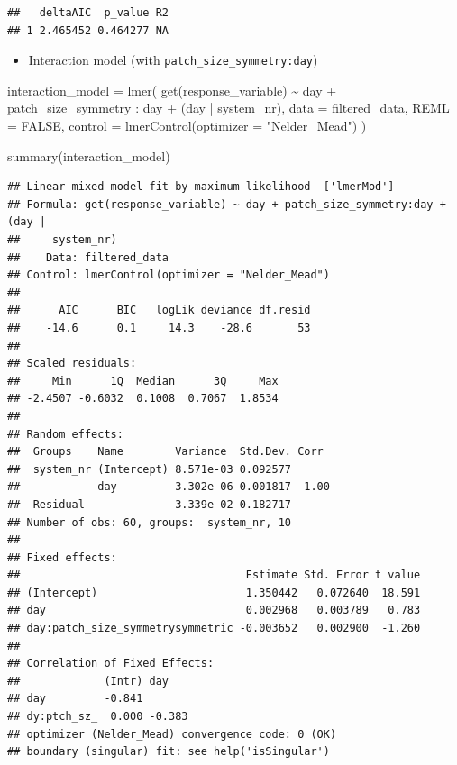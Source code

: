 \documentclass[
]{article}
\newenvironment{Shaded}{\begin{snugshade}}{\end{snugshade}}
\newcommand{\AttributeTok}[1]{\textcolor[rgb]{0.77,0.63,0.00}{#1}}
\newcommand{\ConstantTok}[1]{\textcolor[rgb]{0.00,0.00,0.00}{#1}}
\newcommand{\FunctionTok}[1]{\textcolor[rgb]{0.00,0.00,0.00}{#1}}
\newcommand{\NormalTok}[1]{#1}
\newcommand{\OtherTok}[1]{\textcolor[rgb]{0.56,0.35,0.01}{#1}}
\newcommand{\SpecialCharTok}[1]{\textcolor[rgb]{0.00,0.00,0.00}{#1}}
\newcommand{\StringTok}[1]{\textcolor[rgb]{0.31,0.60,0.02}{#1}}
\providecommand{\tightlist}{%
  \setlength{\itemsep}{0pt}\setlength{\parskip}{0pt}}
\begin{document}
\begin{verbatim}
##   deltaAIC  p_value R2
## 1 2.465452 0.464277 NA
\end{verbatim}

\begin{itemize}
\tightlist
\item
  Interaction model (with \texttt{patch\_size\_symmetry:day})
\end{itemize}

\begin{Shaded}
\begin{Highlighting}[]
\NormalTok{interaction\_model }\OtherTok{=} \FunctionTok{lmer}\NormalTok{(}
  \FunctionTok{get}\NormalTok{(response\_variable) }\SpecialCharTok{\textasciitilde{}}
\NormalTok{    day }\SpecialCharTok{+} 
\NormalTok{    patch\_size\_symmetry }\SpecialCharTok{:}\NormalTok{ day }\SpecialCharTok{+} 
\NormalTok{    (day }\SpecialCharTok{|}\NormalTok{ system\_nr), }
  \AttributeTok{data =}\NormalTok{ filtered\_data,}
  \AttributeTok{REML =} \ConstantTok{FALSE}\NormalTok{,}
  \AttributeTok{control =} \FunctionTok{lmerControl}\NormalTok{(}\AttributeTok{optimizer =} \StringTok{"Nelder\_Mead"}\NormalTok{)}
\NormalTok{)}

\FunctionTok{summary}\NormalTok{(interaction\_model)}
\end{Highlighting}
\end{Shaded}

\begin{verbatim}
## Linear mixed model fit by maximum likelihood  ['lmerMod']
## Formula: get(response_variable) ~ day + patch_size_symmetry:day + (day |  
##     system_nr)
##    Data: filtered_data
## Control: lmerControl(optimizer = "Nelder_Mead")
## 
##      AIC      BIC   logLik deviance df.resid 
##    -14.6      0.1     14.3    -28.6       53 
## 
## Scaled residuals: 
##     Min      1Q  Median      3Q     Max 
## -2.4507 -0.6032  0.1008  0.7067  1.8534 
## 
## Random effects:
##  Groups    Name        Variance  Std.Dev. Corr 
##  system_nr (Intercept) 8.571e-03 0.092577      
##            day         3.302e-06 0.001817 -1.00
##  Residual              3.339e-02 0.182717      
## Number of obs: 60, groups:  system_nr, 10
## 
## Fixed effects:
##                                   Estimate Std. Error t value
## (Intercept)                       1.350442   0.072640  18.591
## day                               0.002968   0.003789   0.783
## day:patch_size_symmetrysymmetric -0.003652   0.002900  -1.260
## 
## Correlation of Fixed Effects:
##             (Intr) day   
## day         -0.841       
## dy:ptch_sz_  0.000 -0.383
## optimizer (Nelder_Mead) convergence code: 0 (OK)
## boundary (singular) fit: see help('isSingular')
\end{verbatim}
\end{document}
